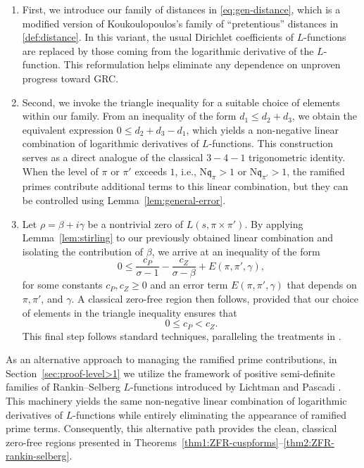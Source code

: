 \documentclass[12pt,reqno]{amsart}
\theoremstyle{remark}
\newcommand{\N}{\mathrm{N}}
\numberwithin{equation}{section}
\begin{document}
\begin{enumerate}
    \item First, we introduce our family of distances in \eqref{eq:gen-distance}, which is a modified version of Koukoulopoulos's family of ``pretentious'' distances in \eqref{def:distance}. In this variant, the usual Dirichlet coefficients of $L$-functions are replaced by those coming from the logarithmic derivative of the $L$-function. This reformulation helps eliminate any dependence on unproven progress toward GRC.
    
    \item Second, we invoke the triangle inequality for a suitable choice of elements within our family. From an inequality of the form $d_1 \le d_2 + d_3$, we obtain the equivalent expression $0 \le d_2 + d_3 - d_1$, which yields a non-negative linear combination of logarithmic derivatives of $L$-functions. This construction serves as a direct analogue of the classical $3-4-1$ trigonometric identity. When the level of $\pi$ or $\pi'$ exceeds $1$, i.e., $\N\mathfrak{q}_{\pi} > 1$ or $\N\mathfrak{q}_{\pi'} >1$, the ramified primes contribute additional terms to this linear combination, but they can be controlled using Lemma~\ref{lem:general-error}.
    
    \item Let $\rho = \beta + i\gamma$ be a nontrivial zero of $L(s, \pi \times \pi')$. By applying Lemma~\ref{lem:stirling} to our previously obtained linear combination and isolating the contribution of $\beta$, we arrive at an inequality of the form
    \begin{equation}\label{eq:desired form-bino}
    0 \le \frac{c_P}{\sigma - 1} - \frac{c_Z}{\sigma - \beta} + E(\pi, \pi', \gamma),
    \end{equation}
    for some constants $c_P, c_Z \ge 0$ and an error term $E(\pi, \pi', \gamma)$ that depends on $\pi, \pi'$, and $\gamma$. A classical zero-free region then follows, provided that our choice of elements in the triangle inequality ensures that 
    \begin{equation}\label{eq:c_P-c_Z-condition}
    0 \le c_P < c_Z.
    \end{equation} 
    This final step follows standard techniques, paralleling the treatments in \cite{D, IK}.
\end{enumerate}
As an alternative approach to managing the ramified prime contributions, in Section~\ref{sec:proof-level>1} we utilize the framework of positive semi-definite families of Rankin--Selberg $L$-functions introduced by Lichtman and Pascadi \cite{LP}. This machinery yields the same non-negative linear combination of logarithmic derivatives of $L$-functions while entirely eliminating the appearance of ramified prime terms. Consequently, this alternative path provides the clean, classical zero-free regions presented in Theorems~\ref{thm1:ZFR-cuspforms}--\ref{thm2:ZFR-rankin-selberg}.
\end{document}
